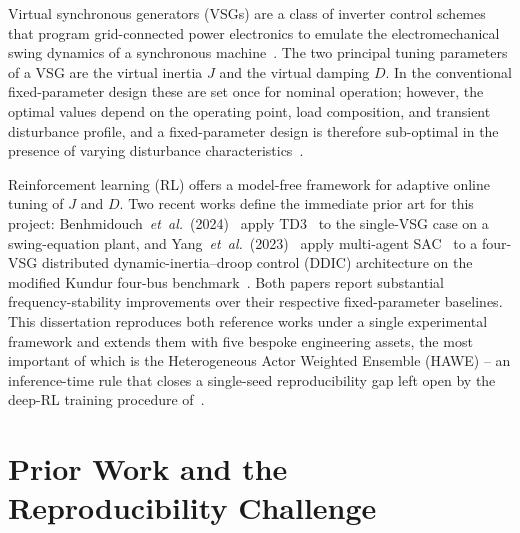 \documentclass{unnc-fyp}
\begin{document}
Virtual synchronous generators (VSGs) are a class of inverter
control schemes that program grid-connected power electronics to
emulate the electromechanical swing dynamics of a synchronous
machine~\cite{beck2007vsg,zhong2011vsg,darco2015vsm}.
The two principal tuning parameters of a VSG are the virtual
inertia $J$ and the virtual damping $D$.
In the conventional fixed-parameter design these are set once for
nominal operation; however, the optimal values depend on the
operating point, load composition, and transient disturbance
profile, and a fixed-parameter design is therefore sub-optimal in
the presence of varying disturbance
characteristics~\cite{bevrani2014vsg}.

Reinforcement learning (RL) offers a model-free framework for
adaptive online tuning of $J$ and $D$.
Two recent works define the immediate prior art for this project:
Benhmidouch~\emph{et~al.}\
(2024)~\cite{benhmidouch2024td3} apply
TD3~\cite{fujimoto2018td3} to the single-VSG case on a
swing-equation plant, and
Yang~\emph{et~al.}\
(2023)~\cite{yang2023ddic} apply multi-agent
SAC~\cite{haarnoja2018sac} to a four-VSG distributed
dynamic-inertia--droop control (DDIC) architecture on the
modified Kundur four-bus benchmark~\cite{kundur1994power,
klein1991study}.
Both papers report substantial frequency-stability improvements
over their respective fixed-parameter baselines.
This dissertation reproduces both reference works under a single
experimental framework and extends them with five bespoke
engineering assets, the most important of which is the
Heterogeneous Actor Weighted Ensemble (HAWE) -- an inference-time
rule that closes a single-seed reproducibility gap left open by
the deep-RL training procedure of~\cite{yang2023ddic}.

\section{Prior Work and the Reproducibility Challenge}
\end{document}
